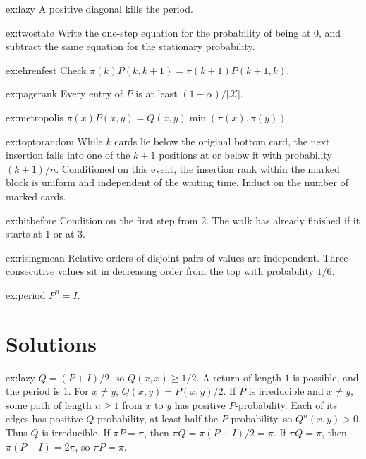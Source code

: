 \begin{hint}{ex:lazy}
A positive diagonal kills the period.
\end{hint}
\begin{hint}{ex:twostate}
Write the one-step equation for the probability of being at $0$, and subtract the same equation for the stationary probability.
\end{hint}
\begin{hint}{ex:ehrenfest}
Check $\pi(k)P(k,k+1)=\pi(k+1)P(k+1,k)$.
\end{hint}
\begin{hint}{ex:pagerank}
Every entry of $P$ is at least $(1-\alpha)/|\mathcal X|$.
\end{hint}
\begin{hint}{ex:metropolis}
$\pi(x)P(x,y)=Q(x,y)\min(\pi(x),\pi(y))$.
\end{hint}
\begin{hint}{ex:toptorandom}
While $k$ cards lie below the original bottom card, the next insertion falls into one of the $k+1$ positions at or below it with probability $(k+1)/n$. Conditioned on this event, the insertion rank within the marked block is uniform and independent of the waiting time. Induct on the number of marked cards.
\end{hint}
\begin{hint}{ex:hitbefore}
Condition on the first step from $2$. The walk has already finished if it starts at $1$ or at $3$.
\end{hint}
\begin{hint}{ex:risingmean}
Relative orders of disjoint pairs of values are independent. Three consecutive values sit in decreasing order from the top with probability $1/6$.
\end{hint}
\begin{hint}{ex:period}
$P^n=I$.
\end{hint}

\section{Solutions}

\begin{solution}{ex:lazy}
\writeup $Q=(P+I)/2$, so $Q(x,x)\ge1/2$. A return of length $1$ is possible, and the period is $1$. For $x\ne y$, $Q(x,y)=P(x,y)/2$. If $P$ is irreducible and $x\ne y$, some path of length $n\ge1$ from $x$ to $y$ has positive $P$-probability. Each of its edges has positive $Q$-probability, at least half the $P$-probability, so $Q^n(x,y)>0$. Thus $Q$ is irreducible. If $\pi P=\pi$, then $\pi Q=\pi(P+I)/2=\pi$. If $\pi Q=\pi$, then $\pi(P+I)=2\pi$, so $\pi P=\pi$.
\end{solution}

